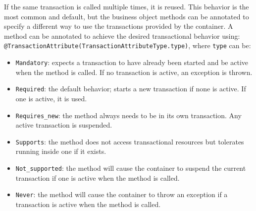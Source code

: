 If the same transaction is called multiple times, it is reused.
This behavior is the most common and default, but the business object methods can be annotated to specify a different way to use the transactions provided by the container. 
A method can be annotated to achieve the desired transactional behavior using: 
\texttt{@TransactionAttribute(TransactionAttributeType.type)}, where \texttt{type} can be: 
\begin{itemize}
    \item \texttt{Mandatory}: expects a transaction to have already been started and be active when the method is called. 
        If no transaction is active, an exception is thrown.
    \item \texttt{Required}: the default behavior; starts a new transaction if none is active. 
        If one is active, it is used.
    \item \texttt{Requires\_new}: the method always needs to be in its own transaction.
        Any active transaction is suspended.
    \item \texttt{Supports}: the method does not access transactional resources but tolerates running inside one if it exists.
    \item \texttt{Not\_supported}: the method will cause the container to suspend the current transaction if one is active when the method is called.
    \item \texttt{Never}: the method will cause the container to throw an exception if a transaction is active when the method is called.
\end{itemize}